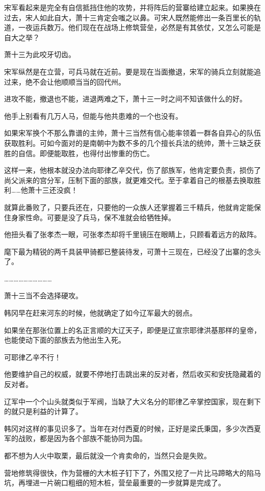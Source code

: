 宋军看起来是完全有自信抵挡住他的攻势，并将阵后的营寨给建立起来。如果换在过去，宋人如此自大，萧十三肯定会嗤之以鼻。可宋人既然能修出一条百里长的轨道，一夜运兵数万。他们现在在战场上修筑营垒，必然是有其依仗，又怎么可能是自大之举？

萧十三为此咬牙切齿。

宋军纵然是在立营，可兵马就在近前。要是现在当面撤退，宋军的骑兵立刻就能追过来，绝不会让他顺顺当当的回代州。

进攻不能，撤退也不能，进退两难之下，萧十三一时之间不知该做什么的好。

他手上别看有几万人马，但能与他共患难的一个也没有。

如果宋军换个不那么靠谱的主帅，萧十三当然有信心能率领着一群各自异心的队伍获取胜利。可如今面对的是南朝中为数不多的几个擅长兵法的统帅，萧十三缺乏获胜的自信。即便能取胜，也得付出惨重的伤亡。

这样一来，他根本就没办法向耶律乙辛交代，伤了部族军，他肯定要负责，损伤了尚父派来的宫分军，压制下面的部族，就更难交代。至于拿着自己的根基去换取胜利……他萧十三还没疯！

就算此番败了，只要兵还在，只要他的一众族人还掌握着三千精兵，他就肯定能保住身家性命。可要是没了兵马，保不准就会给牺牲掉。

他扭头看了张孝杰一眼，可张孝杰却将千里镜压在眼睛上，只顾看着远方的敌阵。

麾下最为精锐的两千具装甲骑都已整装待发，可萧十三现在，已经没了出寨的念头了。

…………………………

萧十三当不会选择硬攻。

韩冈早在赶来河东的时候，他就确定了如今辽军最大的弱点。

如果坐在那张位置上的名正言顺的大辽天子，即便是辽宣宗耶律洪基那样的皇帝，也能使动下面的部族去为他出生入死。

可耶律乙辛不行！

他要维护自己的权威，就要不停地打击跳出来的反对者，然后收买和安抚隐藏着的反对者。

辽军中一个个山头就类似于军阀，当缺了大义名分的耶律乙辛掌控国家，现在剩下的就只是利益的计算了。

韩冈对这样的事见识多了。当年在对付西夏的时候，正好是梁氏秉国，多少次西夏军的战败，都是因为各个部族不能协同为国。

都不想为人火中取栗，最后就没一个肯卖命的，当然只会是失败。

营地修筑得很快，作为营栅的大木桩子钉下了，外围又挖了一片比马蹄略大的陷马坑，再埋进一片碗口粗细的短木桩，营垒最重要的一步就算是完成了。

